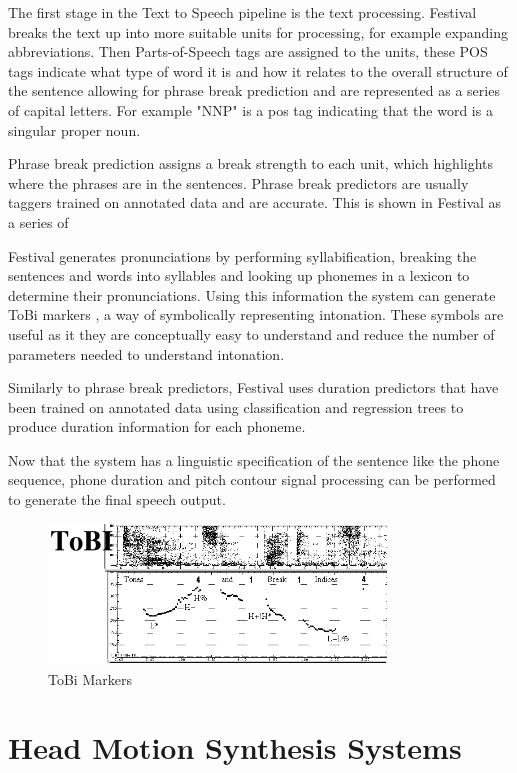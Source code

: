 \documentclass[bsc,frontabs,twoside,singlespacing,parskip]{infthesis}
\begin{document}
The first stage in the Text to Speech pipeline is the text processing. Festival breaks the text up into more suitable units for processing, for example expanding abbreviations. Then Parts-of-Speech tags are assigned to the units, these POS tags indicate what type of word it is and how it relates to the overall structure of the sentence allowing for phrase break prediction and are represented as a series of capital letters. For example "NNP" is a pos tag indicating that the word is a singular proper noun.

Phrase break prediction assigns a break strength to each unit, which highlights where the phrases are in the sentences. Phrase break predictors are usually taggers trained on annotated data and are accurate. This is shown in Festival as a series of 

Festival generates pronunciations by performing syllabification, breaking the sentences and words into syllables and looking up phonemes in a lexicon to determine their pronunciations. Using this information the system can generate ToBi markers \cite{tobi}, a way of symbolically representing intonation. These symbols are useful as it they are conceptually easy to understand and reduce the number of parameters needed to understand intonation.

Similarly to phrase break predictors, Festival uses duration predictors that have been trained on annotated data using classification and regression trees to produce duration information for each phoneme.

Now that the system has a linguistic specification of the sentence like the phone sequence, phone duration and pitch contour signal processing can be performed to generate the final speech output.

\begin{figure}[h!]
	\centering
	\includegraphics[width=0.8\textwidth]{tobi.png}
	\caption{ToBi Markers}
\end{figure}


\section{Head Motion Synthesis Systems}
\end{document}
